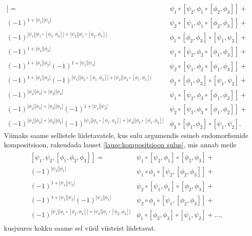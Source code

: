 \begin{align*}
    [\psi_1, \psi_2, [\phi_1, \phi_2, \phi_3]] =\
    &\psi_1 \circ [\psi_2, \phi_1 \circ [\phi_2, \phi_3]] + \\
    (-1)^{ 1 + |\psi_1||\psi_2| }
        &\psi_2 \circ [\psi_1, \phi_1 \circ [\phi_2, \phi_3]] + \\
    (-1)^{
        |\psi_1||\phi_1 \circ [\phi_2, \phi_3]| +
        |\psi_2||\phi_1 \circ [\phi_2, \phi_3]|
    } &\phi_1 \circ [\phi_2, \phi_3] \circ [\psi_1, \psi_2] + \\
    (-1)^{1 + |\phi_1||\phi_2|}
    &\psi_1 \circ [\psi_2, \phi_2 \circ [\phi_1, \phi_3]] + \\
    (-1)^{1 + |\phi_1||\phi_2|}
    (-1)^{ 1 + |\psi_1||\psi_2| }
        &\psi_2 \circ [\psi_1, \phi_2 \circ [\phi_1, \phi_3]] + \\
    (-1)^{1 + |\phi_1||\phi_2|} 
    (-1)^{
        |\psi_1||\phi_2 \circ [\phi_1, \phi_3]| +
        |\psi_2||\phi_2 \circ [\phi_1, \phi_3]|
    } &\phi_2 \circ [\phi_1, \phi_3] \circ [\psi_1, \psi_2] + \\
    (-1)^{|\phi_1||\phi_3| + |\phi_2||\phi_3|} 
    &\psi_1 \circ [\psi_2, \phi_3 \circ [\phi_1, \phi_2]] + \\
    (-1)^{|\phi_1||\phi_3| + |\phi_2||\phi_3|} 
    (-1)^{ 1 + |\psi_1||\psi_2| }
        &\psi_2 \circ [\psi_1, \phi_3 \circ [\phi_1, \phi_2]] + \\
    (-1)^{|\phi_1||\phi_3| + |\phi_2||\phi_3|} 
    (-1)^{
        |\psi_1||\phi_3 \circ [\phi_1, \phi_2]| +
        |\psi_2||\phi_3 \circ [\phi_1, \phi_2]|
    } &\phi_3 \circ [\phi_1, \phi_2] \circ [\psi_1, \psi_2].
\end{align*}
Viimaks saame sellistele liidetavatele, kus sulu argumendis esineb
endomorfismide kompositsioon, rakendada lauset \ref{lause:kompositsioon sulus},
mis annab meile
\begin{align}\begin{split}\label{eq:tern endomorph filippov proof lfs}
    [\psi_1, \psi_2, [\phi_1, \phi_2, \phi_3]] =\
    & \psi_1 \circ [\psi_2, \phi_1] \circ [\phi_2, \phi_3] + \\
    (-1)^{|\psi_2||\phi_1|}
        & \psi_1 \circ \phi_1 \circ [\psi_2, [\phi_2, \phi_3]] + \\
    (-1)^{ 1 + |\psi_1||\psi_2| }
        & \psi_2 \circ [\psi_1, \phi_1] \circ [\phi_2, \phi_3] + \\
    (-1)^{ 1 + |\psi_1||\psi_2| } (-1)^{|\psi_1||\phi_1|}
        & \psi_2 \circ \phi_1 \circ [\psi_1, [\phi_2, \phi_3]] + \\
    (-1)^{
        |\psi_1||\phi_1 \circ [\phi_2, \phi_3]| +
        |\psi_2||\phi_1 \circ [\phi_2, \phi_3]|
    } &\phi_1 \circ [\phi_2, \phi_3] \circ [\psi_1, \psi_2] + \dots,
\end{split}\end{align}
kusjuures kokku saame sel viisil viisteist liidetavat.

